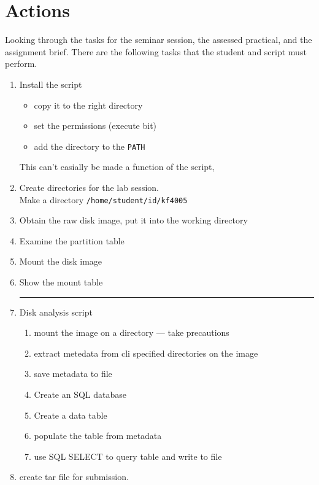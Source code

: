 \documentclass[12pt]{article}
\begin{document}
\section{Actions}
Looking through the tasks for the seminar session, the assessed practical, and the assignment brief.
There are the following tasks that the student and script must perform.
\begin{enumerate}
	\item Install the script
		\begin{itemize}
			\item copy it to the right directory
			\item set the permissions (execute bit)
			\item add the directory to the \verb:PATH:
		\end{itemize}
		This can't easially be made a function of the script,
	\item Create directories for the lab session.\\
		Make a directory \texttt{/home/student/id/kf4005}
	\item Obtain the raw disk image, put it into the working directory
	\item Examine the partition table
	\item Mount the disk image
	\item Show the mount table
	\\\hrule
	\item Disk analysis script
	\begin{enumerate}
		\item mount the image on a directory --- take precautions
		\item extract metedata from cli specified directories on the image
		\item save metadata to file
		\item Create an SQL database
		\item Create a data table
		\item populate the table from metadata
		\item use SQL SELECT to query table and write to file
	\end{enumerate}
	\item create tar file for submission.	
\end{enumerate}
\end{document}
